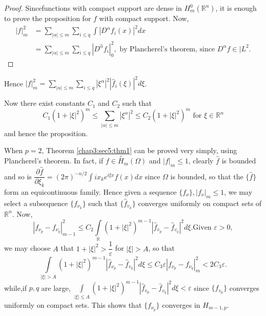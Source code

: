 \begin{proof}
  Since\pageoriginale functions with compact support are dense in
  $H_{m}^0(\mathbb{R}^n)$, it is enough to prove the proposition for
  $f$ with compact support. Now, 
  \begin{align*}
    | f |^2_m & = \sum_{| \alpha | \le m} \sum_{i \le q} \int
    |D^\alpha f_i (x) |^2 dx\\ 
    & = \sum_{| \alpha | \le m} \sum_{i \le q} | D^{\hat{\alpha}} f_i
    |^2_0, \text { by Plancherel's theorem, since } D^\alpha f \in
    |L^2. 
  \end{align*}
\end{proof}

Hence $|f|^2_m =\sum\limits_{| \alpha | \le m} \sum\limits_{i \le q} |
\xi^\alpha |^2 | \hat{f}_i (\xi) |^2 d \xi $. 

Now there exist constants $C_1$ and $C_2$ such that 
$$
C_1 (1+ | \xi |^2 )^m \le \sum_{| \alpha | \le m} |\xi^\alpha |^2 \le
C_2 (1+ | \xi |^2)^m \text {  for  } \xi \in \mathbb{R}^n  
$$
and hence the proposition.

\begin{remark*} %
  When $ p = 2$, Theorem \ref{chap3:sec5:thm1} can be proved very simply, using
  Plancherel's theorem. In fact, if $f \in \overset{\circ}{H}_m (\Omega) $
  and $| f|_m \le 1$, clearly $\hat{f}$ is bounded and so is
  $\dfrac{\partial \hat{f}}{\partial \xi_k} = (2 \pi)^{-n/2} \int i
  x_k e^{i \xi x } f(x) dx$ since $\Omega$ is bounded, so that the
  $\{\hat{f}\}$ form an equicontinuous family. Hence given a sequence
  $\{f_\nu \}, | f_\nu | _m \le 1$, we may select a subsequence
  $\{f_{\nu _k}\}$ such that $\{\hat{f} _{v_k}\}$ converges uniformly
  on compact sets of $\mathbb{R}^n$. Now, 
  $$
  | f_{\nu_p} - f_{\nu_q} |^2_{m - 1} \le C_2 \int\limits_{\mathbb{R}} (1+ |
  \xi |^2 )^{m-1} | \hat {f}_{v_p} - \hat {f}_{v_q} |^2 d \xi. \text {
    Given } \varepsilon > 0, 
  $$ 
  we may choose $A$ that $1+|\xi |^2 > \dfrac{1}{\varepsilon}$ for
  $| \xi | > A$, so that  
  $$
  \int\limits_{ | \xi | > A} (1+ | \xi |^2 )^{m -1} | \hat{f}_{\nu_p}
  - \hat{f}_{v_q} |^2 d \xi \le C_3 \varepsilon | f_{\nu_p} - f_{\nu_q}
  |^2_m < 2 C_3 \varepsilon. 
  $$
  while,\pageoriginale if $p, q$ are large, $\int\limits_{| \xi | \le A} (1+ | \xi
  |^2 )^{m-1} | \hat{f}_{v_p} - \hat{f}_{v_q} |^2 d \xi < \varepsilon$
  since $\{\hat{f}_{v_p}\}$ converges uniformly on compact sets. This
  shows that $\{f_{\nu_p}\}$ converges in $H_{m - 1, p}$. 
\end{remark*}

